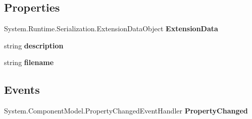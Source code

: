\subsection*{Properties}
\begin{DoxyCompactItemize}
\item 
\mbox{\label{class_wcf_stream_service_client_1_1_service_reference1_1_1_response_file_info_message_a4295bb63d0e688ce7cd33e4af9eabb84}} 
System.\+Runtime.\+Serialization.\+Extension\+Data\+Object {\bfseries Extension\+Data}
\item 
\mbox{\label{class_wcf_stream_service_client_1_1_service_reference1_1_1_response_file_info_message_af13c5830255b25e57d30533dc730111b}} 
string {\bfseries description}
\item 
\mbox{\label{class_wcf_stream_service_client_1_1_service_reference1_1_1_response_file_info_message_a268ec063eb0ecab464dd1c9529c65ff4}} 
string {\bfseries filename}
\end{DoxyCompactItemize}
\subsection*{Events}
\begin{DoxyCompactItemize}
\item 
\mbox{\label{class_wcf_stream_service_client_1_1_service_reference1_1_1_response_file_info_message_a243c34b94c597906c0654d49e80a8e3b}} 
System.\+Component\+Model.\+Property\+Changed\+Event\+Handler {\bfseries Property\+Changed}
\end{DoxyCompactItemize}
